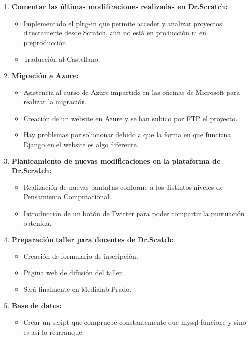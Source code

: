 \documentclass[a4paper,12pt]{letter}
\begin{document}
\begin{letter}
\begin{enumerate}
    
    \item {\textbf {Comentar las últimas modificaciones realizadas en Dr.Scratch:}}
    \begin{itemize}
        \item {Implementado el plug-in que permite acceder y analizar proyectos directamente desde Scratch, aún no está en producción ni en preproducción.}
        \item {Traducción al Castellano.}
    \end{itemize}

    \item{\textbf {Migración a Azure:}}
    \begin{itemize}
        \item {Asistencia al curso de Azure impartido en las oficinas de Microsoft para realizar la migración.}
        \item {Creación de un website en Azure y se han subido por FTP el proyecto.}
        \item {Hay problemas por solucionar debido a que la forma en que funciona Django en el website es algo diferente.}

    \end{itemize}

	\item{\textbf {Planteamiento de nuevas modificaciones en la plataforma de 
                    Dr.Scratch:}}
    \begin{itemize}
        \item {Realización de nuevas pantallas conforme a los distintos niveles de Pensamiento Computacional.}
        \item {Introducción de un botón de Twitter para poder compartir la puntuación obtenida.}
    \end{itemize}

    \item {\textbf {Preparación taller para docentes de Dr.Scatch:}}
        \begin{itemize}
            \item {Creación de formulario de inscripción.}
            \item {Página web de difusión del taller.}
            \item {Será finalmente en Medialab Prado.}
        \end{itemize}

    \item {\textbf {Base de datos:}}
        \begin{itemize}
            \item {Crear un script que compruebe constantemente que mysql funcione y sino es así lo rearranque.}
        \end{itemize}
\end{enumerate}

\end{letter}
\end{document}
